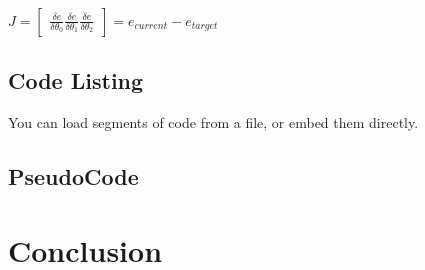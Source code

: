 \documentclass[10pt, a4paper]{article}
\begin{document}
    {\centering \Large \(
        J = \begin{bmatrix}
            \frac{\delta e}{\delta \theta _0}
            \frac{\delta e}{\delta \theta _1}
            \frac{\delta e}{\delta \theta _2}
        \end{bmatrix}
        = e_{current} - e_{target} 
    \)\par}
	
	\subsection{Code Listing}
    You can load segments of code from a file, or embed them directly.
    

    
\subsection{PseudoCode}


	
\section{Conclusion}	


		
\end{document}
